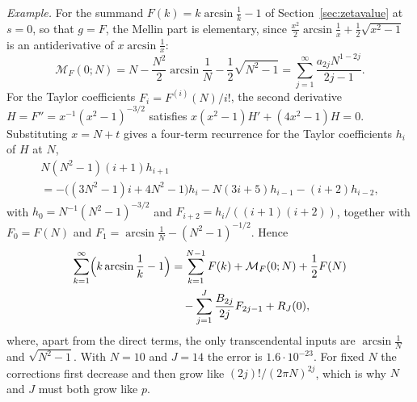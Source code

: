 \documentclass[11pt,reqno]{amsart}
\theoremstyle{definition}
\theoremstyle{remark}
\begin{document}
\emph{Example.} For the summand $F(k) = k\arcsin\frac1k - 1$ of Section~\ref{sec:zetavalue} at $s = 0$, so that $g = F$, the
Mellin part is elementary, since $\frac{x^2}2\arcsin\frac1x + \frac12\sqrt{x^2-1}$ is an antiderivative of
$x\arcsin\frac1x$:
\[
  \mathcal M_F(0;N) = N - \frac{N^2}2\arcsin\frac1N - \frac12\sqrt{N^2-1}
  = \sum_{j=1}^{\infty}\frac{a_{2j}N^{1-2j}}{2j-1}.
\]
For the Taylor coefficients $F_i = F^{(i)}(N)/i!$, the second derivative $H = F'' = x^{-1}(x^2-1)^{-3/2}$ satisfies
$x(x^2-1)H' + (4x^2-1)H = 0$. Substituting $x = N + t$ gives a four-term recurrence for the Taylor coefficients $h_i$ of
$H$ at $N$,
\begin{multline*}
  N(N^2-1)(i+1)h_{i+1} \\ = -\bigl((3N^2-1)i + 4N^2 - 1\bigr)h_i - N(3i+5)h_{i-1} - (i+2)h_{i-2},
\end{multline*}
with $h_0 = N^{-1}(N^2-1)^{-3/2}$ and $F_{i+2} = h_i/((i+1)(i+2))$, together with
$F_0 = F(N)$ and $F_1 = \arcsin\frac1N - (N^2-1)^{-1/2}$. Hence
\begin{align*}
  \sum_{k=1}^{\infty}\Bigl(k\arcsin\frac1k - 1\Bigr) &= \sum_{k=1}^{N-1}F(k) + \mathcal M_F(0;N) + \frac12F(N) \\
  &\quad - \sum_{j=1}^{J}\frac{B_{2j}}{2j}F_{2j-1} + R_J(0),
\end{align*}
where, apart from the direct terms, the only transcendental inputs are $\arcsin\frac1N$ and $\sqrt{N^2-1}$. With
$N = 10$ and $J = 14$ the error is $1.6\cdot10^{-23}$. For fixed $N$ the corrections first decrease and then grow
like $(2j)!/(2\pi N)^{2j}$, which is why $N$ and $J$ must both grow like $p$.
\end{document}
